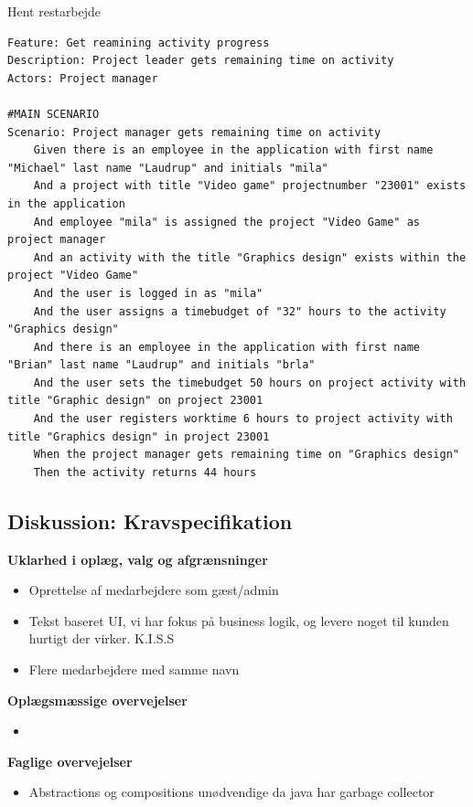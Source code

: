 \begin{listing}[H]
    \centering
    \caption{Hent restarbejde}\label{lst:remainingTime}
    \begin{verbatim}
Feature: Get reamining activity progress
Description: Project leader gets remaining time on activity
Actors: Project manager

#MAIN SCENARIO
Scenario: Project manager gets remaining time on activity
    Given there is an employee in the application with first name "Michael" last name "Laudrup" and initials "mila"
    And a project with title "Video game" projectnumber "23001" exists in the application
    And employee "mila" is assigned the project "Video Game" as project manager
    And an activity with the title "Graphics design" exists within the project "Video Game"
    And the user is logged in as "mila"
    And the user assigns a timebudget of "32" hours to the activity "Graphics design"
    And there is an employee in the application with first name "Brian" last name "Laudrup" and initials "brla"
    And the user sets the timebudget 50 hours on project activity with title "Graphic design" on project 23001
    And the user registers worktime 6 hours to project activity with title "Graphics design" in project 23001
    When the project manager gets remaining time on "Graphics design"
    Then the activity returns 44 hours
    \end{verbatim}
\end{listing}
\subsection{Diskussion: Kravspecifikation}
\textbf{Uklarhed i oplæg, valg og afgrænsninger}
\begin{itemize}
    \item Oprettelse af medarbejdere som gæst/admin
    \item Tekst baseret UI, vi har fokus på business logik, og levere noget til kunden hurtigt der virker. K.I.S.S
    \item Flere medarbejdere med samme navn
\end{itemize}
\textbf{Oplægsmæssige overvejelser}
\begin{itemize}
    \item
\end{itemize}
\textbf{Faglige overvejelser}
\begin{itemize}
    \item Abstractions og compositions unødvendige da java har garbage collector
\end{itemize}\newpage